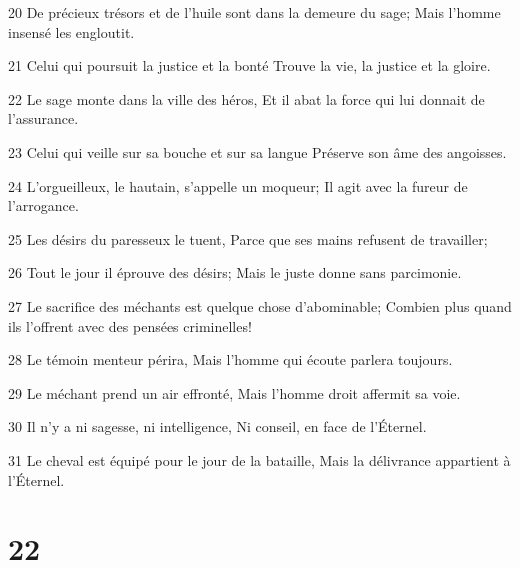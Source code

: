 \par 20 De précieux trésors et de l'huile sont dans la demeure du sage; Mais l'homme insensé les engloutit.
\par 21 Celui qui poursuit la justice et la bonté Trouve la vie, la justice et la gloire.
\par 22 Le sage monte dans la ville des héros, Et il abat la force qui lui donnait de l'assurance.
\par 23 Celui qui veille sur sa bouche et sur sa langue Préserve son âme des angoisses.
\par 24 L'orgueilleux, le hautain, s'appelle un moqueur; Il agit avec la fureur de l'arrogance.
\par 25 Les désirs du paresseux le tuent, Parce que ses mains refusent de travailler;
\par 26 Tout le jour il éprouve des désirs; Mais le juste donne sans parcimonie.
\par 27 Le sacrifice des méchants est quelque chose d'abominable; Combien plus quand ils l'offrent avec des pensées criminelles!
\par 28 Le témoin menteur périra, Mais l'homme qui écoute parlera toujours.
\par 29 Le méchant prend un air effronté, Mais l'homme droit affermit sa voie.
\par 30 Il n'y a ni sagesse, ni intelligence, Ni conseil, en face de l'Éternel.
\par 31 Le cheval est équipé pour le jour de la bataille, Mais la délivrance appartient à l'Éternel.

\chapter{22}

